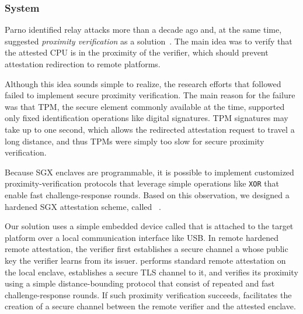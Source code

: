 \subsubsection*{\proximitee System}

Parno identified relay attacks more than a decade ago and, at the same time, suggested \emph{proximity verification} as a solution~\cite{parno2008bootstrapping}. The main idea was to verify that the attested CPU is in the proximity of the verifier, which should prevent attestation redirection to remote platforms. 

Although this idea sounds simple to realize, the research efforts that followed failed to implement secure proximity verification. The main reason for the failure was that TPM, the secure element commonly available at the time, supported only fixed identification operations like digital signatures. TPM signatures may take up to one second, which allows the redirected attestation request to travel a long distance, and thus TPMs were simply too slow for secure proximity verification. %

Because SGX enclaves are programmable, it is possible to implement customized proximity-verification protocols that leverage simple operations like \texttt{XOR} that enable fast challenge-response rounds. Based on this observation, we designed a hardened SGX attestation scheme, called \proximitee~\cite{proximitee}. %

Our solution uses a simple embedded device called \key that is attached to the target platform over a local communication interface like USB. In remote hardened remote attestation, the verifier first establishes a secure channel a \key whose public key the verifier learns from its issuer. \key performs standard remote attestation on the local enclave, establishes a secure TLS channel to it, and verifies its proximity using a simple distance-bounding protocol that consist of repeated and fast challenge-response rounds. If such proximity verification succeeds, \key facilitates the creation of a secure channel between the remote verifier and the attested enclave. 



